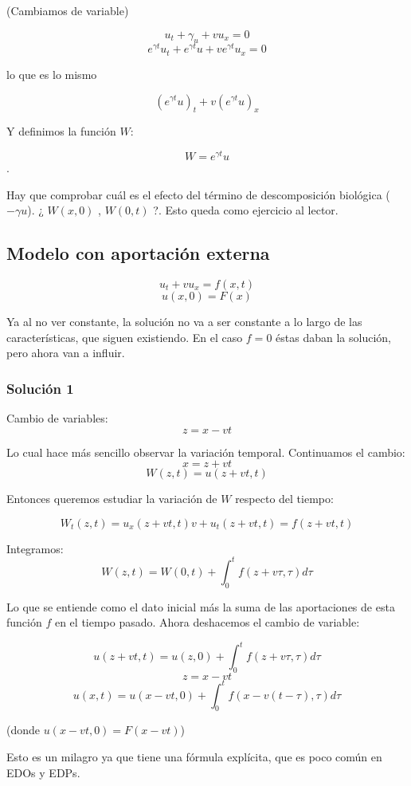 		(Cambiamos de variable)

		$$u_t + \gamma_u + vu_x = 0$$
		$$e^{\gamma t} u_t + e^{\gamma t} u + v e^{ \gamma t} u_x = 0 $$

		lo que es lo mismo

		$$(e^{\gamma t}u)_t + v (e^{\gamma t} u)_x$$

		Y definimos la función $W$:

		$$W = e^{\gamma t}u$$.


		Hay que comprobar cuál es el efecto del término de descomposición biológica ($-\gamma u$). ¿ $W(x,0)$ , $ W(0,t)$ ?. Esto queda como ejercicio al lector.


	\subsection{Modelo con aportación externa}

		$$u_t + vu_x = f(x,t)$$
		$$u(x,0) = F(x)$$

		Ya al no ver constante, la solución no va a ser constante a lo largo de las características, que siguen existiendo. En el caso $f = 0$ éstas daban la solución, pero ahora van a influir.


		\subsubsection{Solución 1}

			Cambio de variables:
			$$z = x-vt$$

			Lo cual hace más sencillo observar la variación temporal. Continuamos el cambio:
			$$x = z + vt$$
			$$W(z,t) = u(z+vt, t)$$

			Entonces queremos estudiar la variación de $W$ respecto del tiempo:

			$$W_t(z,t) = u_x(z + vt, t)v + u_t(z+vt, t) = f(z + vt, t)$$

			Integramos:
			$$W(z,t) = W(0,t) + \int^{t}_{0} f(z+v\tau, \tau) d\tau $$

			Lo que se entiende como el dato inicial más la suma de las aportaciones de esta función $f$ en el tiempo pasado. Ahora deshacemos el cambio de variable:

			$$u(z + vt, t) = u(z,0) + \int^{t}_{0} f(z+v\tau, \tau) d\tau$$
			$$z = x-vt$$
			$$u(x,t) = u(x-vt,0)+ \int^{t}_{0} f(x-v(t-\tau),\tau) d\tau$$

			(donde $u(x-vt,0) = F(x-vt)$)

			Esto es un milagro ya que tiene una fórmula explícita, que es poco común en EDOs y EDPs.

